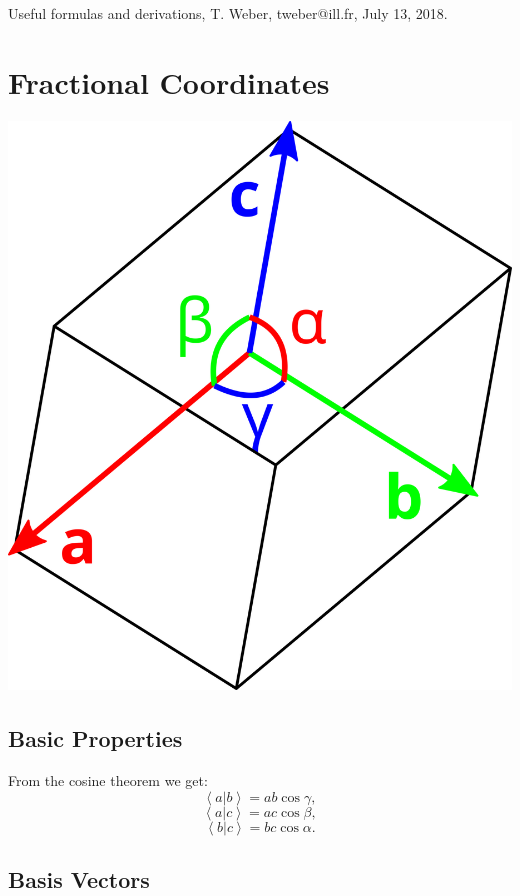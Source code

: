 \documentclass{article}
\begin{document}
Useful formulas and derivations, T. Weber, tweber@ill.fr, July 13, 2018.






\section{Fractional Coordinates}

\begin{center}
	\includegraphics[width = 0.2 \textwidth]{cell}
\end{center}

\subsection*{Basic Properties}

From the cosine theorem we get:
\begin{equation} \left< a | b \right > = ab \cos \gamma, \label{ab} \end{equation}
\begin{equation} \left< a | c \right > = ac \cos \beta, \label{ac} \end{equation}
\begin{equation} \left< b | c \right > = bc \cos \alpha. \label{bc} \end{equation}


\subsection*{Basis Vectors}
\end{document}
